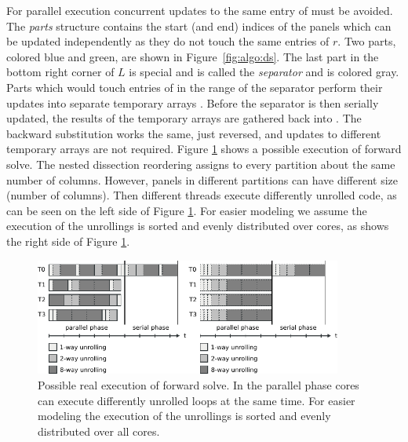 For parallel execution concurrent updates to the same entry of \vr{} must be
avoided.
The \textit{parts} structure contains the start (and end) indices of the panels
which can be updated independently as they do not touch the same entries of $r$.
Two parts, colored blue and green, are shown in Figure~\ref{fig:algo:ds}.
The last part in the bottom right corner of $L$ is special and is called the 
\textit{separator} and is colored gray.
%
Parts which would touch entries of \vr{} in the range of the separator perform 
their updates into separate temporary arrays \vtemp{}.
Before the separator is then serially updated, the results of the temporary
arrays are gathered back into \vr{}. 
The backward substitution works the same, just reversed, and
updates to different temporary arrays are not required.
Figure \ref{fig:ecm-parallel-model} shows a possible execution of forward solve. The nested dissection reordering assigns to every partition about the same number of columns. However, panels in different partitions can have different size (number of columns). Then different threads execute differently unrolled code, as can be seen on the left side of Figure \ref{fig:ecm-parallel-model}. For easier modeling we assume the execution of the unrollings is sorted and evenly distributed over cores, as shows the right side of Figure \ref{fig:ecm-parallel-model}.

\begin{figure}[t]
  \centering
  \includegraphics[width=0.9\textwidth,clip=true]{images/ecm-parallel-model}
   \caption{Possible real execution of forward solve. In the parallel phase cores can execute differently unrolled loops at the same time. For easier modeling the execution of the unrollings is sorted and evenly distributed over all cores.}
  \label{fig:ecm-parallel-model}%
\end{figure}


